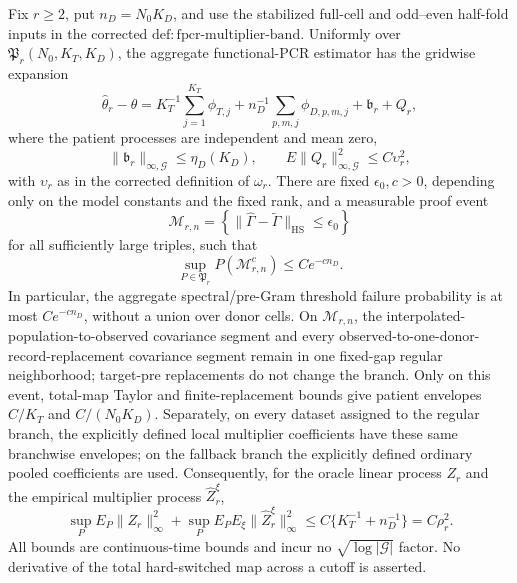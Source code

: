 Fix \(r\ge2\), put \(n_D=N_0K_D\), and use the stabilized full-cell and odd--even half-fold inputs in the corrected \(\mathrm{def:fpcr\mbox{-}multiplier\mbox{-}band}\). Uniformly over \(\mathfrak P_r(N_0,K_T,K_D)\), the aggregate functional-PCR estimator has the gridwise expansion
\[
 \widehat\theta_r-\theta
 =K_T^{-1}\sum_{j=1}^{K_T}\phi_{T,j}
 +n_D^{-1}\sum_{p,m,j}\phi_{D,p,m,j}
 +\mathfrak b_r+Q_r,
\]
where the patient processes are independent and mean zero,
\[
 \|\mathfrak b_r\|_{\infty,\mathcal G}\le\eta_D(K_D),
 \qquad E\|Q_r\|_{\infty,\mathcal G}^2\le C\upsilon_r^2,
\]
with \(\upsilon_r\) as in the corrected definition of \(\omega_r\). There are fixed \(\epsilon_0,c>0\), depending only on the model constants and the fixed rank, and a measurable proof event
\[
 \mathcal M_{r,n}=\left\{\|\widehat\Gamma-\widetilde\Gamma\|_{\mathrm{HS}}\le\epsilon_0\right\}
\]
for all sufficiently large triples, such that
\[
 \sup_{P\in\mathfrak P_r}P(\mathcal M_{r,n}^c)\le Ce^{-cn_D}.
\]
In particular, the aggregate spectral/pre-Gram threshold failure probability is at most \(Ce^{-cn_D}\), without a union over donor cells.
On \(\mathcal M_{r,n}\), the interpolated-population-to-observed covariance segment and every observed-to-one-donor-record-replacement covariance segment remain in one fixed-gap regular neighborhood; target-pre replacements do not change the branch. Only on this event, total-map Taylor and finite-replacement bounds give patient envelopes \(C/K_T\) and \(C/(N_0K_D)\). Separately, on every dataset assigned to the regular branch, the explicitly defined local multiplier coefficients have these same branchwise envelopes; on the fallback branch the explicitly defined ordinary pooled coefficients are used. Consequently, for the oracle linear process \(Z_r\) and the empirical multiplier process \(\widehat Z_r^\xi\),
\[
 \sup_PE_P\|Z_r\|_\infty^2
 +\sup_PE_PE_\xi\|\widehat Z_r^\xi\|_\infty^2
 \le C\{K_T^{-1}+n_D^{-1}\}=C\rho_r^2.
\]
All bounds are continuous-time bounds and incur no \(\sqrt{\log|\mathcal G|}\) factor. No derivative of the total hard-switched map across a cutoff is asserted.
